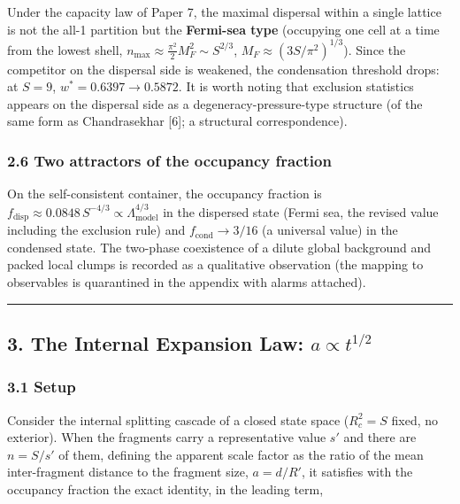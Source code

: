\documentclass[
]{article}
\begin{document}
Under the capacity law of Paper 7, the maximal dispersal within a single
lattice is not the all-1 partition but the \textbf{Fermi-sea type}
(occupying one cell at a time from the lowest shell,
\(n_{\max}\approx\tfrac{\pi^2}2 M_F^2\sim S^{2/3}\),
\(M_F\approx(3S/\pi^2)^{1/3}\)). Since the competitor on the dispersal
side is weakened, the condensation threshold drops: at \(S=9\),
\(w^*=0.6397\to0.5872\). It is worth noting that exclusion statistics
appears on the dispersal side as a degeneracy-pressure-type structure
(of the same form as Chandrasekhar {[}6{]}; a structural
correspondence).

\subsubsection{2.6 Two attractors of the occupancy
fraction}\label{two-attractors-of-the-occupancy-fraction}

On the self-consistent container, the occupancy fraction is
\(f_{\mathrm{disp}}\approx0.0848\,S^{-4/3}\propto\Lambda_{\mathrm{model}}^{4/3}\)
in the dispersed state (Fermi sea, the revised value including the
exclusion rule) and \(f_{\mathrm{cond}}\to3/16\) (a universal value) in
the condensed state. The two-phase coexistence of a dilute global
background and packed local clumps is recorded as a qualitative
observation (the mapping to observables is quarantined in the appendix
with alarms attached).

\begin{center}\rule{0.5\linewidth}{0.5pt}\end{center}

\subsection{\texorpdfstring{3. The Internal Expansion Law:
\(a\propto t^{1/2}\)}{3. The Internal Expansion Law: a\textbackslash propto t\^{}\{1/2\}}}\label{the-internal-expansion-law-apropto-t12}

\subsubsection{3.1 Setup}\label{setup}

Consider the internal splitting cascade of a closed state space
(\(R_c^2=S\) fixed, no exterior). When the fragments carry a
representative value \(s'\) and there are \(n=S/s'\) of them, defining
the apparent scale factor as the ratio of the mean inter-fragment
distance to the fragment size, \(a=d/R'\), it satisfies with the
occupancy fraction the exact identity, in the leading term,
\end{document}
